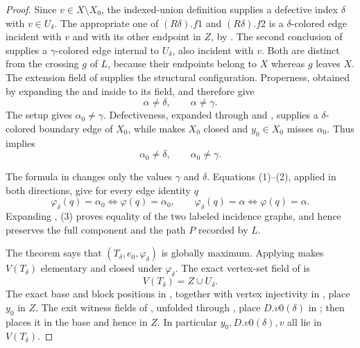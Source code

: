 \begin{proof}
Since $v\in X\setminus X_0$, the indexed-union definition
 supplies a defective index $\delta$
with $v\in U_\delta$.  The appropriate one of $(R\delta).f1$ and
$(R\delta).f2$ is a $\delta$-colored edge incident with $v$ and with its
other endpoint in $Z$, by .  The second
conclusion of  supplies a
$\gamma$-colored edge internal to $U_\delta$, also incident with $v$.
Both are distinct from the crossing $g$ of $L$, because their endpoints
belong to $X$ whereas $g$ leaves $X$.  The extension field of
 supplies the structural
configuration.  Properness, obtained by expanding
the  and  inside
 to its
 field, and
 therefore give
\[
 \alpha\ne\delta,\qquad \alpha\ne\gamma.                 \tag{1}
\]
The setup  gives
$\alpha_0\ne\gamma$.  Defectiveness, expanded through
 and , supplies a
$\delta$-colored boundary edge of $X_0$, while
 makes
$X_0$ closed and $y_0\in X_0$ misses $\alpha_0$.  Thus
 implies
\[
 \alpha_0\ne\delta,\qquad \alpha_0\ne\gamma.             \tag{2}
\]

The formula in  changes only the values
$\gamma$ and $\delta$.  Equations (1)--(2), applied in both directions,
give for every edge identity $q$
\[
 \varphi_\delta(q)=\alpha_0\iff\varphi(q)=\alpha_0,
 \qquad
 \varphi_\delta(q)=\alpha\iff\varphi(q)=\alpha.           \tag{3}
\]
Expanding , (3) proves equality of the
two labeled incidence graphs, and hence preserves the full component and
the path $P$ recorded by $L$.

The theorem  says that
$(T_\delta,e_0,\varphi_\delta)$ is globally maximum.  Applying
 makes $V(T_\delta)$ elementary and
closed under $\varphi_\delta$.  The exact vertex-set field of
 is
\[
 V(T_\delta)=Z\cup U_\delta.                              \tag{4}
\]
The exact base and block positions in
, together with vertex
injectivity in , place $y_0$ in $Z$.  The exit
witness fields of , unfolded through
, place $D.v0(\delta)$ in
; then
 places it in the base and hence
in $Z$.  In particular $y_0,D.v0(\delta),v$ all lie in $V(T_\delta)$.


\end{proof}
